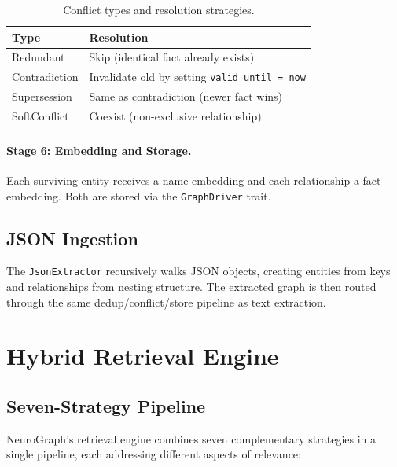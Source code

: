 \documentclass[11pt,a4paper,twocolumn]{article}
\begin{document}
\begin{table}[H]
\centering
\caption{Conflict types and resolution strategies.}
\label{tab:conflicts}
\begin{tabularx}{\columnwidth}{lX}
\toprule
\textbf{Type} & \textbf{Resolution} \\
\midrule
Redundant & Skip (identical fact already exists) \\
Contradiction & Invalidate old by setting
  \texttt{valid\_until = now} \\
Supersession & Same as contradiction (newer fact wins) \\
SoftConflict & Coexist (non-exclusive relationship) \\
\bottomrule
\end{tabularx}
\end{table}

\paragraph{Stage 6: Embedding and Storage.}
Each surviving entity receives a name embedding and each relationship
a fact embedding. Both are stored via the \texttt{GraphDriver} trait.

\subsection{JSON Ingestion}

The \texttt{JsonExtractor} recursively walks JSON objects, creating
entities from keys and relationships from nesting structure. The
extracted graph is then routed through the same dedup/conflict/store
pipeline as text extraction.

\section{Hybrid Retrieval Engine}
\label{sec:retrieval}

\subsection{Seven-Strategy Pipeline}

NeuroGraph's retrieval engine combines seven complementary strategies
in a single pipeline, each addressing different aspects of relevance:
\end{document}
